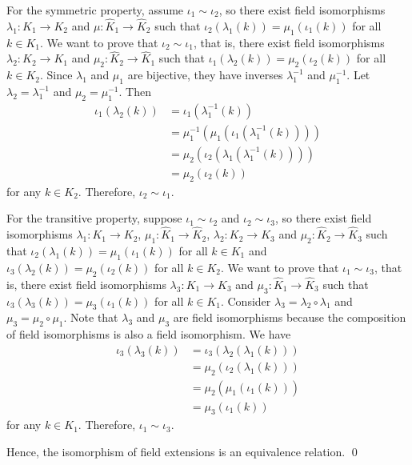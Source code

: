 \documentclass[a4paper, 12pt]{article}
\newcommand{\lt}{\left}
\newcommand{\rt}{\right}
\newcommand{\epf}{\hfill \qed}
\begin{document}
For the symmetric property, assume $\iota_1 \sim \iota_2$, so there exist field isomorphisms $\lambda_1 : K_1 \to K_2$ and $\mu : \hat{K}_1 \to \hat{K}_2$ such that $\iota_2(\lambda_1(k))=\mu_1(\iota_1(k))$ for all $k \in K_1$. We want to prove that $\iota_2 \sim \iota_1$, that is, there exist field isomorphisms $\lambda_2 : K_2 \to K_1$ and $\mu_2 : \hat{K}_2 \to \hat{K}_1$ such that $\iota_1(\lambda_2(k)) = \mu_2(\iota_2(k))$ for all $k \in K_2$. Since $\lambda_1$ and $\mu_1$ are bijective, they have inverses $\lambda_1^{-1}$ and $\mu_1^{-1}$. Let $\lambda_2=\lambda_1^{-1}$ and $\mu_2=\mu_1^{-1}$. Then
\begin{align*}
    \iota_1(\lambda_2(k)) &= \iota_1\lt(\lambda_1^{-1}(k)\rt) \\
    &= \mu_1^{-1}\lt(\mu_1\lt(\iota_1\lt(\lambda_1^{-1}(k)\rt)\rt)\rt) \\
    &= \mu_2\lt(\iota_2\lt(\lambda_1\lt(\lambda_1^{-1}(k)\rt)\rt)\rt) \\
    &= \mu_2(\iota_2(k))
\end{align*}
for any $k \in K_2$. Therefore, $\iota_2 \sim \iota_1$.

For the transitive property, suppose $\iota_1 \sim \iota_2$ and $\iota_2 \sim \iota_3$, so there exist field isomorphisms $\lambda_1 : K_1 \to K_2$, $\mu_1 : \hat{K}_1 \to \hat{K}_2$, $\lambda_2 : K_2 \to K_3$ and $\mu_2 : \hat{K}_2 \to \hat{K}_3$ such that $\iota_2(\lambda_1(k))=\mu_1(\iota_1(k))$ for all $k \in K_1$ and $\iota_3(\lambda_2(k))=\mu_2(\iota_2(k))$ for all $k \in K_2$. We want to prove that $\iota_1 \sim \iota_3$, that is, there exist field isomorphisms $\lambda_3 : K_1 \to K_3$ and $\mu_3 : \hat{K}_1 \to \hat{K}_3$ such that $\iota_3(\lambda_3(k))=\mu_3(\iota_1(k))$ for all $k \in K_1$. Consider $\lambda_3 = \lambda_2 \circ \lambda_1$ and $\mu_3 = \mu_2 \circ \mu_1$. Note that $\lambda_3$ and $\mu_3$ are field isomorphisms because the composition of field isomorphisms is also a field isomorphism. We have
\begin{align*}
    \iota_3(\lambda_3(k)) &= \iota_3(\lambda_2(\lambda_1(k))) \\
    &= \mu_2(\iota_2(\lambda_1(k))) \\
    &= \mu_2(\mu_1(\iota_1(k))) \\
    &= \mu_3(\iota_1(k))
\end{align*}
for any $k \in K_1$. Therefore, $\iota_1 \sim \iota_3$.

Hence, the isomorphism of field extensions is an equivalence relation. \epf
\end{document}
